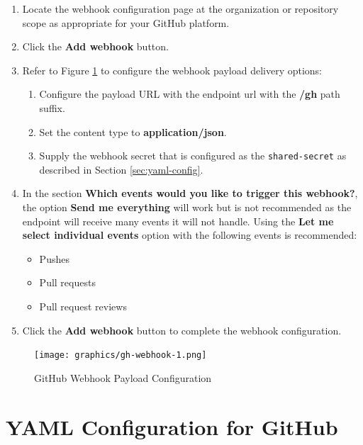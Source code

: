 \begin{enumerate}
    \item Locate the webhook configuration page at the organization or repository scope as appropriate for your
    GitHub platform.
    \item Click the \textbf{Add webhook} button.
    \item Refer to Figure \ref{fig:gh-webhook-1} to configure the webhook payload delivery options:
    \begin{enumerate}
        \item Configure the payload URL with the \cxoneflow endpoint url with the \textbf{/gh} path suffix.
        \item Set the content type to \textbf{application/json}.
        \item Supply the webhook secret that is configured as the \texttt{shared-secret} as described in
        Section \ref{sec:yaml-config}.
    \end{enumerate}
    \item In the section \textbf{Which events would you like to trigger this webhook?}, the option \textbf{Send me everything}
    will work but is not recommended as the \cxoneflow endpoint will receive many events it will not handle.  Using the
    \textbf{Let me select individual events} option with the following events is recommended:
    \begin{itemize}
        \item Pushes
        \item Pull requests
        \item Pull request reviews
    \end{itemize}
    \item Click the \textbf{Add webhook} button to complete the webhook configuration.
\end{enumerate}

\begin{figure}[ht]
    \texttt{[image: graphics/gh-webhook-1.png]}
    \caption{GitHub Webhook Payload Configuration}
    \label{fig:gh-webhook-1}
\end{figure}



\FloatBarrier

\section{\cxoneflowtext\space YAML Configuration for GitHub}\label{sec:gh-yaml-config}

